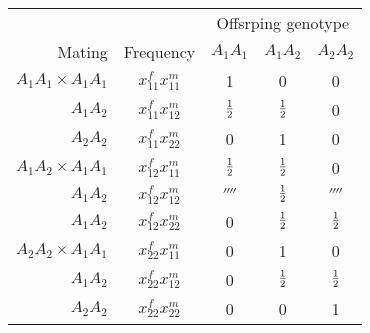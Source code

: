 \documentclass[12pt]{article}
\begin{document}
\begin{center}
\begin{tabular}{rcccc}
                       &           & \multicolumn{3}{c}{Offsrping genotype} \\
Mating                 & Frequency     & $A_1A_1$ & $A_1A_2$ & $A_2A_2$ \\
\hline
$A_1A_1 \times A_1A_1$ & $x_{11}^fx_{11}^m$     &        1 &        0 &        0 \\
              $A_1A_2$ & $x_{11}^fx_{12}^m$ &    $\frac{1}{2}$ &    $\frac{1}{2}$ &        0 \\
              $A_2A_2$ & $x_{11}^fx_{22}^m$ &        0 &        1 &        0 \\
$A_1A_2 \times A_1A_1$ & $x_{12}^fx_{11}^m$ &    $\frac{1}{2}$ &    $\frac{1}{2}$ &        0 \\
              $A_1A_2$ & $x_{12}^fx_{12}^m$     &  $\fourth$ &    $\frac{1}{2}$ &  $\fourth$ \\
              $A_1A_2$ & $x_{12}^fx_{22}^m$ &        0 &    $\frac{1}{2}$ &    $\frac{1}{2}$ \\
$A_2A_2 \times A_1A_1$ & $x_{22}^fx_{11}^m$ &        0 &        1 &        0 \\
              $A_1A_2$ & $x_{22}^fx_{12}^m$ &        0 &    $\frac{1}{2}$ &    $\frac{1}{2}$ \\
              $A_2A_2$ & $x_{22}^fx_{22}^m$     &        0 &
0 & 1 \\
\end{tabular}
\end{center}
\end{document}
